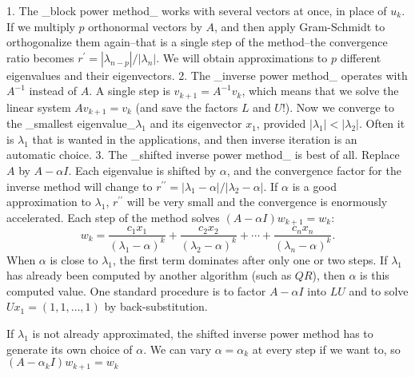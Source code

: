 1. The _block power method_ works with several vectors at once, in place of \(u_{k}\). If we multiply \(p\) orthonormal vectors by \(A\), and then apply Gram-Schmidt to orthogonalize them again--that is a single step of the method--the convergence ratio becomes \(r^{\prime}=|\lambda_{n-p}|/|\lambda_{n}|\). We will obtain approximations to \(p\) different eigenvalues and their eigenvectors.
2. The _inverse power method_ operates with \(A^{-1}\) instead of \(A\). A single step is \(v_{k+1}=A^{-1}v_{k}\), which means that we solve the linear system \(Av_{k+1}=v_{k}\) (and save the factors \(L\) and \(U\)!). Now we converge to the _smallest eigenvalue_\(\lambda_{1}\) and its eigenvector \(x_{1}\), provided \(|\lambda_{1}|<|\lambda_{2}|\). Often it is \(\lambda_{1}\) that is wanted in the applications, and then inverse iteration is an automatic choice.
3. The _shifted inverse power method_ is best of all. Replace \(A\) by \(A-\alpha I\). Each eigenvalue is shifted by \(\alpha\), and the convergence factor for the inverse method will change to \(r^{\prime\prime}=|\lambda_{1}-\alpha|/|\lambda_{2}-\alpha|\). If \(\alpha\) is a good approximation to \(\lambda_{1}\), \(r^{\prime\prime}\) will be very small and the convergence is enormously accelerated. Each step of the method solves \((A-\alpha I)w_{k+1}=w_{k}\): \[w_{k}=\frac{c_{1}x_{1}}{(\lambda_{1}-\alpha)^{k}}+\frac{c_{2}x_{2}}{(\lambda _{2}-\alpha)^{k}}+\cdots+\frac{c_{n}x_{n}}{(\lambda_{n}-\alpha)^{k}}.\] When \(\alpha\) is close to \(\lambda_{1}\), the first term dominates after only one or two steps. If \(\lambda_{1}\) has already been computed by another algorithm (such as \(QR\)), then \(\alpha\) is this computed value. One standard procedure is to factor \(A-\alpha I\) into \(LU\) and to solve \(Ux_{1}=(1,1,\ldots,1)\) by back-substitution.

If \(\lambda_{1}\) is not already approximated, the shifted inverse power method has to generate its own choice of \(\alpha\). We can vary \(\alpha=\alpha_{k}\) at every step if we want to, so \((A-\alpha_{k}I)w_{k+1}=w_{k}\) 
